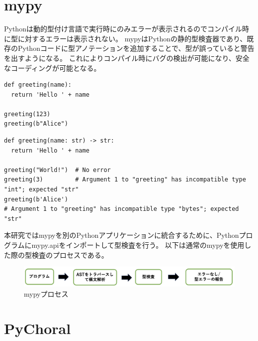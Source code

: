\documentclass{thesis}
\begin{document}
\chapter{mypy}
Pythonは動的型付け言語で実行時にのみエラーが表示されるのでコンパイル時に型に対するエラーは表示されない。
mypyはPythonの静的型検査器であり、既存のPythonコードに型アノテーションを追加することで、型が誤っていると警告を出すようになる。
これによりコンパイル時にバグの検出が可能になり、安全なコーディングが可能となる。
\begin{lstlisting}[caption=型注釈のないPythonコード]
def greeting(name):
  return 'Hello ' + name

greeting(123)
greeting(b"Alice")
\end{lstlisting}
\begin{lstlisting}[caption=型注釈のあるPythonコード]
def greeting(name: str) -> str:
  return 'Hello ' + name

greeting("World!")  # No error
greeting(3)         # Argument 1 to "greeting" has incompatible type "int"; expected "str"
greeting(b'Alice')  
# Argument 1 to "greeting" has incompatible type "bytes"; expected "str"
\end{lstlisting}
本研究ではmypyを別のPythonアプリケーションに統合するために、Pythonプログラムにmypy.apiをインポートして型検査を行う。
以下は通常のmypyを使用した際の型検査のプロセスである。
\begin{figure}[H]
  \centering
  \includegraphics[scale=0.6]{image/mypyprocess.png}
  \caption{mypyプロセス}
\end{figure}
\chapter{PyChoral}
\end{document}

